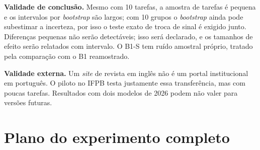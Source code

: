 \documentclass[12pt]{article}
\begin{document}
\textbf{Validade de conclusão.} Mesmo com 10 tarefas, a amostra de tarefas é pequena e os intervalos por \textit{bootstrap} são largos; com 10 grupos o \textit{bootstrap} ainda pode subestimar a incerteza, por isso o teste exato de troca de sinal é exigido junto. Diferenças pequenas não serão detectáveis; isso será declarado, e os tamanhos de efeito serão relatados com intervalo. O B1-S tem ruído amostral próprio, tratado pela comparação com o B1 reamostrado.

\textbf{Validade externa.} Um \textit{site} de revista em inglês não é um portal institucional em português. O piloto no IFPB testa justamente essa transferência, mas com poucas tarefas. Resultados com dois modelos de 2026 podem não valer para versões futuras.

\section{Plano do experimento completo}
\label{sec:plano}
\end{document}
